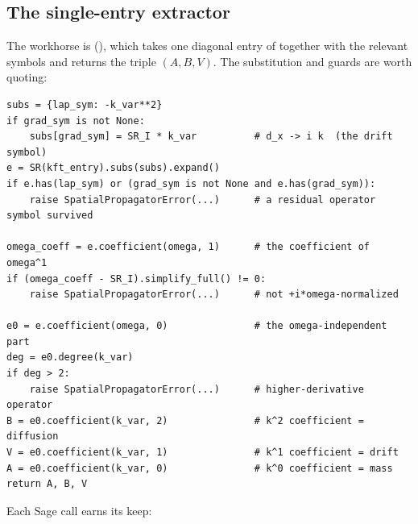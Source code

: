 \subsection{The single-entry extractor}

The workhorse is  (),
which takes one diagonal entry of  together with the relevant
symbols and returns the triple $(A,B,V)$. The substitution and guards are worth
quoting:

\begin{lstlisting}
subs = {lap_sym: -k_var**2}
if grad_sym is not None:
    subs[grad_sym] = SR_I * k_var          # d_x -> i k  (the drift symbol)
e = SR(kft_entry).subs(subs).expand()
if e.has(lap_sym) or (grad_sym is not None and e.has(grad_sym)):
    raise SpatialPropagatorError(...)      # a residual operator symbol survived

omega_coeff = e.coefficient(omega, 1)      # the coefficient of omega^1
if (omega_coeff - SR_I).simplify_full() != 0:
    raise SpatialPropagatorError(...)      # not +i*omega-normalized

e0 = e.coefficient(omega, 0)               # the omega-independent part
deg = e0.degree(k_var)
if deg > 2:
    raise SpatialPropagatorError(...)      # higher-derivative operator
B = e0.coefficient(k_var, 2)               # k^2 coefficient = diffusion
V = e0.coefficient(k_var, 1)               # k^1 coefficient = drift
A = e0.coefficient(k_var, 0)               # k^0 coefficient = mass
return A, B, V
\end{lstlisting}

Each Sage call earns its keep:

